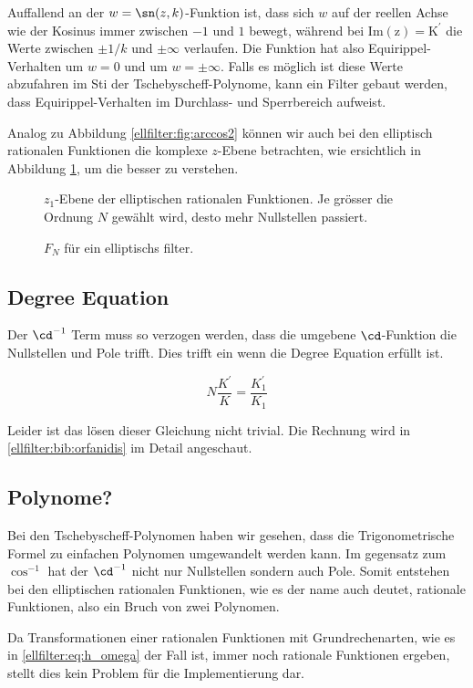 Auffallend an der $w = \sn(z, k)$-Funktion ist, dass sich $w$ auf der reellen Achse wie der Kosinus immer zwischen $-1$ und $1$ bewegt, während bei $\mathrm{Im(z) = K^\prime}$ die Werte zwischen $\pm 1/k$ und $\pm \infty$ verlaufen.
Die Funktion hat also Equirippel-Verhalten um $w=0$ und um $w=\pm \infty$.
Falls es möglich ist diese Werte abzufahren im Sti der Tschebyscheff-Polynome, kann ein Filter gebaut werden, dass Equirippel-Verhalten im Durchlass- und Sperrbereich aufweist.



Analog zu Abbildung \ref{ellfilter:fig:arccos2} können wir auch bei den elliptisch rationalen Funktionen die komplexe $z$-Ebene betrachten, wie ersichtlich in Abbildung \ref{ellfilter:fig:cd2}, um die besser zu verstehen.
\begin{figure}
    \centering
    
    \caption{
        $z_1$-Ebene der elliptischen rationalen Funktionen.
        Je grösser die Ordnung $N$ gewählt wird, desto mehr Nullstellen passiert.
    }
    \label{ellfilter:fig:cd2}
\end{figure}



\begin{figure}
    \centering
    
    \caption{$F_N$ für ein elliptischs filter.}
    \label{ellfilter:fig:elliptic}
\end{figure}

\subsection{Degree Equation}

Der $\cd^{-1}$ Term muss so verzogen werden, dass die umgebene $\cd$-Funktion die Nullstellen und Pole trifft.
Dies trifft ein wenn die Degree Equation erfüllt ist.

\begin{equation}
    N \frac{K^\prime}{K} = \frac{K^\prime_1}{K_1}
\end{equation}


Leider ist das lösen dieser Gleichung nicht trivial.
Die Rechnung wird in \ref{ellfilter:bib:orfanidis} im Detail angeschaut.


\subsection{Polynome?}

Bei den Tschebyscheff-Polynomen haben wir gesehen, dass die Trigonometrische Formel zu einfachen Polynomen umgewandelt werden kann.
Im gegensatz zum $\cos^{-1}$ hat der $\cd^{-1}$ nicht nur Nullstellen sondern auch Pole.
Somit entstehen bei den elliptischen rationalen Funktionen, wie es der name auch deutet, rationale Funktionen, also ein Bruch von zwei Polynomen.

Da Transformationen einer rationalen Funktionen mit Grundrechenarten, wie es in \eqref{ellfilter:eq:h_omega} der Fall ist, immer noch rationale Funktionen ergeben, stellt dies kein Problem für die Implementierung dar.
